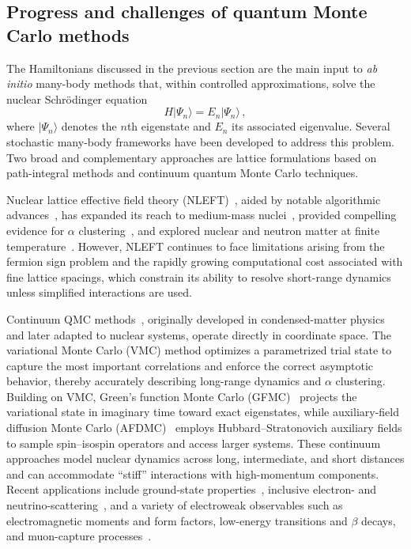     
\subsection{Progress and challenges of quantum Monte Carlo methods}
\label{sub:qmc_methods}


The Hamiltonians discussed in the previous section are the main input to \emph{ab initio} many-body methods that, within controlled approximations, solve the nuclear Schr\"odinger equation
\begin{equation}
H |\Psi_n\rangle = E_n |\Psi_n\rangle\,,
\end{equation}
where $|\Psi_n\rangle$ denotes the $n$th eigenstate and $E_n$ its associated eigenvalue.
Several stochastic many-body frameworks have been developed to address this problem. 
Two broad and complementary approaches are lattice formulations based on path-integral methods and continuum quantum Monte Carlo techniques.

Nuclear lattice effective field theory (NLEFT)~\cite{epelbaum_ab_2011,lee_lattice_2025}, aided by notable algorithmic advances~\cite{sarkar_floating_2023}, has expanded its reach to medium-mass nuclei~\cite{elhatisari_wavefunction_2024}, provided compelling evidence for $\alpha$ clustering~\cite{shen_emergent_2023}, and explored nuclear and neutron matter at finite temperature~\cite{Ren:2023ued,ma_structure_2024}. 
However, NLEFT continues to face limitations arising from the fermion sign problem and the rapidly growing computational cost associated with fine lattice spacings, which constrain its ability to resolve short-range dynamics unless simplified interactions are used.

Continuum QMC methods~\cite{carlson_quantum_2015,gandolfi2020}, originally developed in condensed-matter physics and later adapted to nuclear systems, operate directly in coordinate space. 
The variational Monte Carlo (VMC) method optimizes a parametrized trial state to capture the most important correlations and enforce the correct asymptotic behavior, thereby accurately describing long-range dynamics and $\alpha$ clustering. 
Building on VMC, Green’s function Monte Carlo (GFMC)~\cite{carlson_greens_1987,carlson_alpha_1988} projects the variational state in imaginary time toward exact eigenstates, while auxiliary-field diffusion Monte Carlo (AFDMC)~\cite{Schmidt:1999lik} employs Hubbard--Stratonovich auxiliary fields to sample spin--isospin operators and access larger systems.  
These continuum approaches model nuclear dynamics across long, intermediate, and short distances and can accommodate ``stiff'' interactions with high-momentum components.  
Recent applications include ground-state properties~\cite{piarulli_light-nuclei_2018}, inclusive electron- and neutrino-scattering~\cite{lovato_ab_2020,andreoli_quantum_2024}, and a variety of electroweak observables such as electromagnetic moments and form factors, low-energy transitions and $\beta$ decays, and muon-capture processes~\cite{king_ab_2023,chambers-wall_quantum_2024}.




